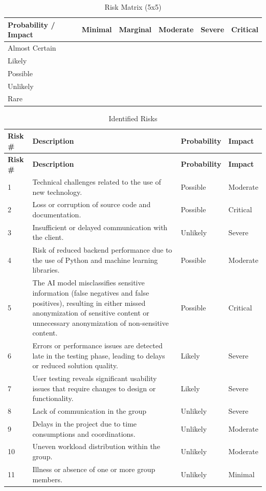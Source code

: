 \begin{table}[H]
\centering
\caption{Risk Matrix (5x5)}
\label{tab:project-plan-risk-matrix}
\begin{tabular}{lccccc}
\toprule
\textbf{Probability / Impact} & \textbf{Minimal} & \textbf{Marginal} & \textbf{Moderate} & \textbf{Severe} & \textbf{Critical} \\
\midrule
Almost Certain & & & & & \\
Likely & & & & & \\
Possible & & & & & \\
Unlikely & & & & & \\
Rare & & & & & \\
\bottomrule
\end{tabular}
\end{table}

\begin{longtable}{p{}p{}p{}p{}}
\caption{Identified Risks}\label{tab:project-plan-identified-risks}\\
\toprule
\textbf{Risk \#} & \textbf{Description} & \textbf{Probability} & \textbf{Impact} \\
\midrule
\endfirsthead
\toprule
\textbf{Risk \#} & \textbf{Description} & \textbf{Probability} & \textbf{Impact} \\
\midrule
\endhead
1 & Technical challenges related to the use of new technology. & Possible & Moderate \\
2 & Loss or corruption of source code and documentation. & Possible & Critical \\
3 & Insufficient or delayed communication with the client. & Unlikely & Severe \\
4 & Risk of reduced backend performance due to the use of Python and machine learning libraries. & Possible & Moderate \\
5 & The AI model misclassifies sensitive information (false negatives and false positives), resulting in either missed anonymization of sensitive content or unnecessary anonymization of non-sensitive content. & Possible & Critical \\
6 & Errors or performance issues are detected late in the testing phase, leading to delays or reduced solution quality. & Likely & Severe \\
7 & User testing reveals significant usability issues that require changes to design or functionality. & Likely & Severe \\
8 & Lack of communication in the group & Unlikely & Severe \\
9 & Delays in the project due to time consumptions and coordinations. & Unlikely & Moderate \\
10 & Uneven workload distribution within the group. & Unlikely & Moderate \\
11 & Illness or absence of one or more group members. & Unlikely & Minimal \\
\bottomrule
\end{longtable}

